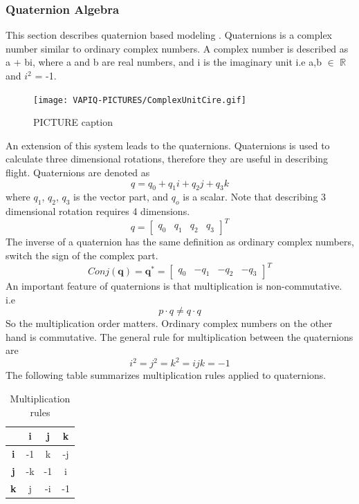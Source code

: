 \subsubsection{Quaternion Algebra}
This section describes quaternion based modeling \cite{lule}. Quaternions is a complex number similar to ordinary complex numbers. A complex number is described as  a +  bi, where a and b are real numbers, and i is the imaginary unit i.e a,b $\in$ $\mathbb{R}$ and $i^2$ = -1.
\begin{figure}[H]
    \centering
    \texttt{[image: VAPIQ-PICTURES/ComplexUnitCire.gif]}
    \caption{PICTURE caption}
    \label{fig:unitCircle}
\end{figure}
\noindent
An extension of this system leads to the quaternions. Quaternions is used to calculate three dimensional rotations, therefore they are useful in describing flight. Quaternions are denoted as
\begin{equation}
q = q_0 + q_1i + q_2j + q_3k
\end{equation}
where $q_1$, $q_2$, $q_3$ is the vector part, and $q_o$ is a scalar. Note that describing 3 dimensional rotation requires 4 dimensions.%
\begin{equation}
q = \begin{bmatrix}
    q_0 & q_1 & q_2 & q_3 
\end{bmatrix}^T
\end{equation}
The inverse of a quaternion has the same definition as ordinary complex numbers, switch the sign of the complex part.
\begin{equation}
Conj(\textbf{q}) = \textbf{q}^* = \begin{bmatrix}
    q_0 & -q_1 & -q_2 & -q_3 
\end{bmatrix}^T
\end{equation}
An important feature of quaternions is that multiplication is non-commutative. i.e
\begin{equation}
    p\cdot q \neq q\cdot q
\end{equation}
So the multiplication order matters. Ordinary complex numbers on the other hand is commutative.
The general rule for multiplication between the quaternions are
\begin{equation}
i^2 = j^2 = k^2 = ijk = -1
\end{equation}
The following table summarizes multiplication rules applied to quaternions.
\begin{table}[h]
\centering
\begin{tabular}{ |c|c|c|c| }
 \hline
 \textbf{} & \textbf{i} & \textbf{j} & \textbf{k} \\ 
 \hline
\textbf{i} & -1 & k & -j \\
\textbf{j} & -k & -1 & i \\
\textbf{k} & j & -i & -1 \\ 
\hline
\end{tabular}
\caption{Multiplication rules}
\label{tabular:quatRules}
\end{table}
